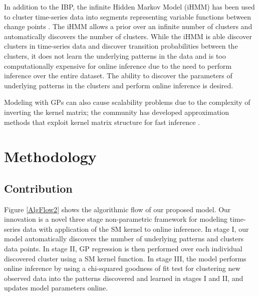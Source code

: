 \documentclass{article}
\begin{document}
In addition to the IBP, the infinite Hidden Markov Model (iHMM) has been used to cluster time-series data into segments representing variable functions between change points \cite{BeamiHMM}. The iHMM allows a prior over an infinite number of clusters and automatically discovers the number of clusters. While the iHMM is able discover clusters in time-series data and discover transition probabilities between the clusters, it does not learn the underlying patterns in the data and is too computationally expensive for online inference due to the need to perform inference over the entire dataset. The ability to discover the parameters of underlying patterns in the clusters and perform online inference is desired.

Modeling with GPs can also cause scalability problems due to the complexity of inverting the kernel matrix; the community has developed approximation methods that exploit kernel matrix structure for fast inference \cite{KISS-GP}.


\section{Methodology}

\subsection{Contribution}
Figure \ref{AlgFlow2} shows the algorithmic flow of our proposed model. Our innovation is a novel three stage non-parametric framework for modeling time-series data with application of the SM kernel to online inference. In stage I, our model automatically discovers the number of underlying patterns and clusters data points. In stage II, GP regression is then performed over each individual discovered cluster using a SM kernel function. In stage III, the model performs online inference by using a chi-squared goodness of fit test for clustering new observed data into the patterns discovered and learned in stages I and II, and updates model parameters online. 
\end{document}
